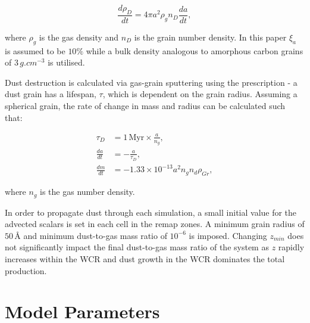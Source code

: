 \begin{equation}
  \frac{d\rho_D}{dt}  = 4 \pi a^2 \rho_g n_D \frac{da}{dt} , 
\end{equation}

\noindent
where $\rho_g$ is the gas density and $n_D$ is the grain number density.
In this paper $\xi_a$ is assumed to be $10\%$ while a bulk density analogous to amorphous carbon grains of $3 \, \si{g.cm^{-3}}$ is utilised.

Dust destruction is calculated via gas-grain sputtering using the \textcite{draine_destruction_1979} prescription - a dust grain has a lifespan, $\tau$, which is dependent on the grain radius.
Assuming a spherical grain, the rate of change in mass and radius can be calculated such that:

\begin{subequations}
  \begin{align}
           \tau_D & = 1 \, \text{Myr} \times \frac{a}{n_g} , \\
    \frac{da}{dt} & = - \frac{a}{\tau_D} , \\
    \frac{dm}{dt} & = -1.33 \times 10^{-13} a^2 n_g n_d \rho_{Gr} ,
  \end{align}
\end{subequations}

\noindent
where $n_g$ is the gas number density.


In order to propagate dust through each simulation, a small initial value for the advected scalars is set in each cell in the remap zones.
A minimum grain radius of $50 \, \text{\AA}$ and minimum dust-to-gas mass ratio of $10^{-6}$ is imposed.
Changing $z_{min}$ does not significantly impact the final dust-to-gas mass ratio of the system as $z$ rapidly increases within the WCR and dust growth in the WCR dominates the total production.

\section{Model Parameters}

